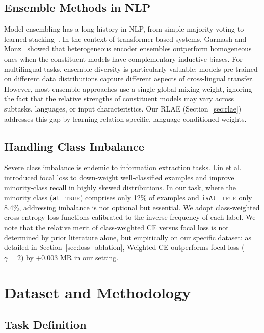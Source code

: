 \documentclass[11pt,a4paper]{article}
\begin{document}
\subsection{Ensemble Methods in NLP}

Model ensembling has a long history in NLP, from simple majority voting to learned stacking~\cite{wolpert1992}. In the context of transformer-based systems, Garmash and Monz~\cite{garmash2016} showed that heterogeneous encoder ensembles outperform homogeneous ones when the constituent models have complementary inductive biases. For multilingual tasks, ensemble diversity is particularly valuable: models pre-trained on different data distributions capture different aspects of cross-lingual transfer. However, most ensemble approaches use a single global mixing weight, ignoring the fact that the relative strengths of constituent models may vary across subtasks, languages, or input characteristics. Our RLAE (Section~\ref{sec:rlae}) addresses this gap by learning relation-specific, language-conditioned weights.

\subsection{Handling Class Imbalance}

Severe class imbalance is endemic to information extraction tasks. Lin et al.~\cite{lin2017} introduced focal loss to down-weight well-classified examples and improve minority-class recall in highly skewed distributions. In our task, where the minority class (\texttt{at}=\textsc{true}) comprises only 12\% of examples and \texttt{isAt}=\textsc{true} only 8.4\%, addressing imbalance is not optional but essential. We adopt class-weighted cross-entropy loss functions calibrated to the inverse frequency of each label. We note that the relative merit of class-weighted CE versus focal loss is not determined by prior literature alone, but empirically on our specific dataset: as detailed in Section~\ref{sec:loss_ablation}, Weighted CE outperforms focal loss ($\gamma=2$) by +0.003 MR in our setting.

\section{Dataset and Methodology}
\label{sec:dataset}

\subsection{Task Definition}
\end{document}
